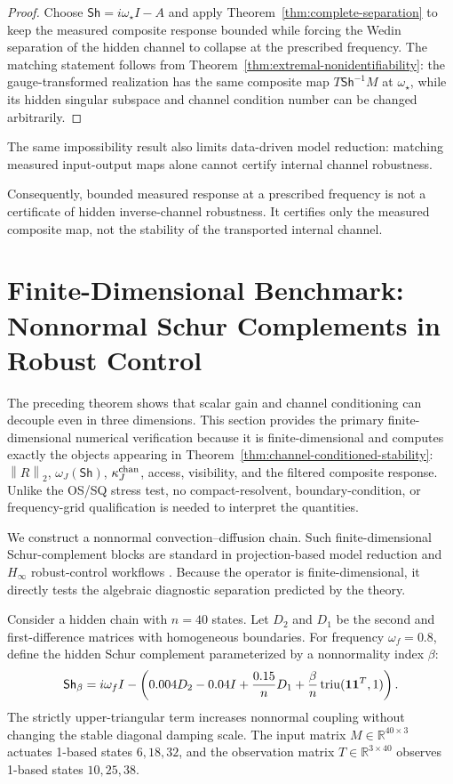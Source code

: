 \documentclass[review]{siamart220329}
\theoremstyle{definition}
\theoremstyle{remark}
\newcommand{\R}{\mathbb{R}}
\newcommand{\Sh}{\mathsf{Sh}}
\newcommand{\norm}[1]{\left\lVert #1\right\rVert}
\begin{document}
\begin{proof}
Choose $\Sh=i\omega_\star I-A$ and apply
Theorem~\ref{thm:complete-separation} to keep the measured composite response
bounded while forcing the Wedin separation of the hidden channel to collapse at
the prescribed frequency. The matching statement follows from
Theorem~\ref{thm:extremal-nonidentifiability}: the gauge-transformed realization
has the same composite map $T\Sh^{-1}M$ at $\omega_\star$, while its hidden
singular subspace and channel condition number can be changed arbitrarily.
\end{proof}
The same impossibility result also limits data-driven model reduction: matching measured input-output maps alone cannot certify internal channel robustness.


Consequently, bounded measured response at a prescribed frequency is not a
certificate of hidden inverse-channel robustness. It certifies only the measured
composite map, not the stability of the transported internal channel.

\section{Finite-Dimensional Benchmark: Nonnormal Schur Complements in Robust Control}\label{sec:numerics}

The preceding theorem shows that scalar gain and channel conditioning can decouple
even in three dimensions. This section provides the primary finite-dimensional numerical verification
because it is finite-dimensional and computes exactly the objects appearing in
Theorem~\ref{thm:channel-conditioned-stability}: $\norm{R}_2$, $\omega_J(\Sh)$,
$\kappa_J^{\rm chan}$, access, visibility, and the filtered composite response.
Unlike the OS/SQ stress test, no compact-resolvent, boundary-condition, or
frequency-grid qualification is needed to interpret the quantities.

We construct a nonnormal convection--diffusion chain. Such finite-dimensional
Schur-complement blocks are standard in projection-based model reduction and
$H_\infty$ robust-control workflows \cite{BennerGugercinWillcox2015,ZhouDoyleGlover1996}.
Because the operator is finite-dimensional, it directly tests the algebraic
diagnostic separation predicted by the theory.

Consider a hidden chain with $n=40$ states. Let $D_2$ and $D_1$ be the second and
first-difference matrices with homogeneous boundaries. For frequency
$\omega_f=0.8$, define the hidden Schur complement parameterized by a
nonnormality index $\beta$:
\begin{equation}
    \Sh_\beta=i\omega_f I- \left( 0.004D_2-0.04I+\frac{0.15}{n}D_1+\frac{\beta}{n}\operatorname{triu}({\bf 1}{\bf 1}^T,1) \right).
    \label{eq:application-schur}
\end{equation}
The strictly upper-triangular term increases nonnormal coupling without changing
the stable diagonal damping scale. The input matrix $M\in\R^{40\times 3}$
actuates 1-based states $6,18,32$, and the observation matrix $T\in\R^{3\times 40}$
observes 1-based states $10,25,38$.
\end{document}
